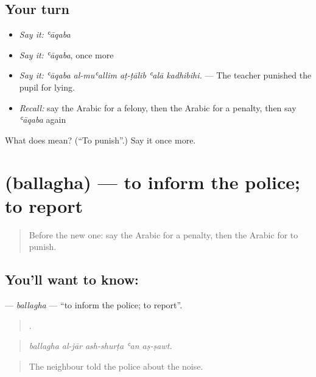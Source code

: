 \subsection*{Your turn}
\begin{itemize}
\raggedright
  \item \emph{Say it:} \emph{ʿāqaba}
  \item \emph{Say it:} \emph{ʿāqaba}, once more
  \item \emph{Say it:} \emph{ʿāqaba al-muʿallim aṭ-ṭālib ʿalā kadhibihi.} — The teacher punished the pupil for lying.
  \item \emph{Recall:} say the Arabic for a felony, then the Arabic for a penalty, then say \emph{ʿāqaba} again
\end{itemize}

\begin{tcolorbox}[breakable,colback=teal!4,colframe=teal!35!black,title={Before you move on}]
What does  mean? (\textquotedblleft{}To punish\textquotedblright{}.) Say it once more.
\end{tcolorbox}
\section[\texorpdfstring{\ar{بلغ} (ballagha)}{بلغ (ballagha)}]{ (ballagha) — to inform the police; to report}

\label{lesson:AR-C348-ballagha}



\begin{quote}
Before the new one: say the Arabic for a penalty, then the Arabic for to punish.
\end{quote}

\subsection*{You'll want to know: }
\textbf{} — \emph{ballagha} — \textquotedblleft{}to inform the police; to report\textquotedblright{}.

\begin{quote}
    .
\end{quote}

\begin{quote}
\emph{ballagha al-jār ash-shurṭa ʿan aṣ-ṣawt.}
\end{quote}

\begin{quote}
The neighbour told the police about the noise.
\end{quote}

